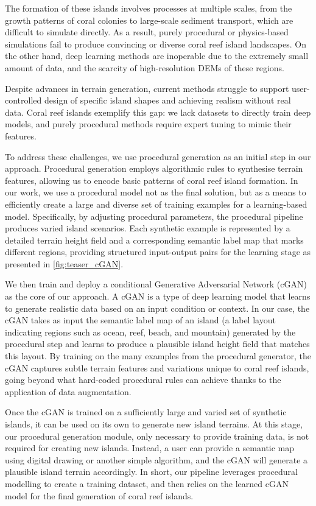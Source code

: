 The formation of these islands involves processes at multiple scales, from the growth patterns of coral colonies to large-scale sediment transport, which are difficult to simulate directly. As a result, purely procedural or physics-based simulations fail to produce convincing or diverse coral reef island landscapes. On the other hand, deep learning methods are inoperable due to the extremely small amount of data, and the scarcity of high-resolution DEMs of these regions.

Despite advances in terrain generation, current methods struggle to support user-controlled design of specific island shapes and achieving realism without real data. Coral reef islands exemplify this gap: we lack datasets to directly train deep models, and purely procedural methods require expert tuning to mimic their features.

To address these challenges, we use procedural generation as an initial step in our approach. Procedural generation employs algorithmic rules to synthesise terrain features, allowing us to encode basic patterns of coral reef island formation. In our work, we use a procedural model not as the final solution, but as a means to efficiently create a large and diverse set of training examples for a learning-based model. Specifically, by adjusting procedural parameters, the procedural pipeline produces varied island scenarios. Each synthetic example is represented by a detailed terrain height field and a corresponding semantic label map that marks different regions, providing structured input-output pairs for the learning stage as presented in \cref{fig:teaser_cGAN}.

We then train and deploy a conditional Generative Adversarial Network (cGAN) as the core of our approach. A cGAN is a type of deep learning model that learns to generate realistic data based on an input condition or context. In our case, the cGAN takes as input the semantic label map of an island (a label layout indicating regions such as ocean, reef, beach, and mountain) generated by the procedural step and learns to produce a plausible island height field that matches this layout. By training on the many examples from the procedural generator, the cGAN captures subtle terrain features and variations unique to coral reef islands, going beyond what hard-coded procedural rules can achieve thanks to the application of data augmentation.

Once the cGAN is trained on a sufficiently large and varied set of synthetic islands, it can be used on its own to generate new island terrains. At this stage, our procedural generation module, only necessary to provide training data, is not required for creating new islands. Instead, a user can provide a semantic map using digital drawing or another simple algorithm, and the cGAN will generate a plausible island terrain accordingly. In short, our pipeline leverages procedural modelling to create a training dataset, and then relies on the learned cGAN model for the final generation of coral reef islands.


